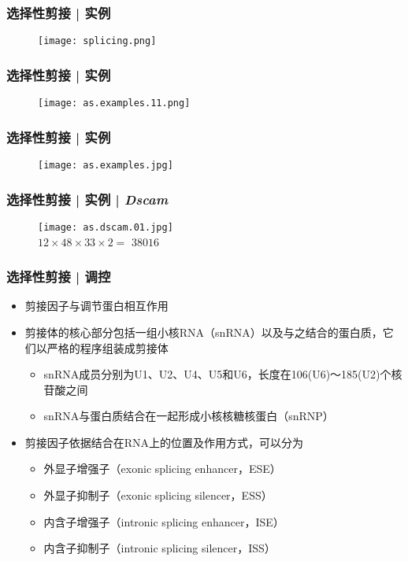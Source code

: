 \begin{frame}
  \frametitle{选择性剪接 | 实例}
  \begin{figure}
    \centering
    \texttt{[image: splicing.png]}
  \end{figure}
\end{frame}

\begin{frame}
  \frametitle{选择性剪接 | 实例}
  \begin{figure}
    \centering
    \texttt{[image: as.examples.11.png]}
  \end{figure}
\end{frame}

\begin{frame}
  \frametitle{选择性剪接 | 实例}
  \begin{figure}
    \centering
    \texttt{[image: as.examples.jpg]}
  \end{figure}
\end{frame}

\begin{frame}
  \frametitle{选择性剪接 | 实例 | \textit{Dscam}}
  \begin{figure}
    \centering
    \texttt{[image: as.dscam.01.jpg]}
    \\ \Large{$12 \times 48 \times 33 \times 2 = $}
    \pause
    \Large{$38016$}
  \end{figure}
\end{frame}

\begin{frame}
  \frametitle{选择性剪接 | 调控}
  \begin{itemize}
    \item 剪接因子与调节蛋白相互作用
    \item 剪接体的核心部分包括一组小核RNA（snRNA）以及与之结合的蛋白质，它们以严格的程序组装成剪接体
      \begin{itemize}
	\item snRNA成员分别为U1、U2、U4、U5和U6，长度在106(U6)～185(U2)个核苷酸之间
	\item snRNA与蛋白质结合在一起形成小核核糖核蛋白（snRNP）
      \end{itemize}
    \item 剪接因子依据结合在RNA上的位置及作用方式，可以分为
      \begin{itemize}
	\item 外显子增强子（exonic splicing enhancer，ESE）
	\item 外显子抑制子（exonic splicing silencer，ESS）
	\item 内含子增强子（intronic splicing enhancer，ISE）
	\item 内含子抑制子（intronic splicing silencer，ISS）
      \end{itemize}
  \end{itemize}
\end{frame}

